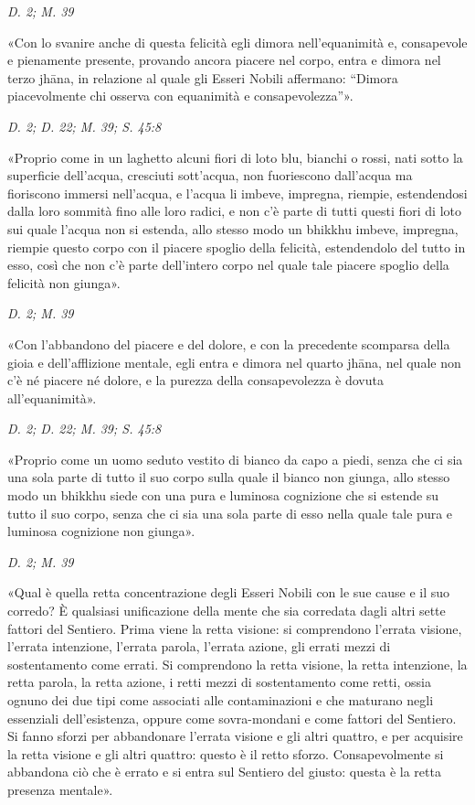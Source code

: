 \emph{D. 2; M. 39}


«Con lo svanire anche di questa felicità egli dimora nell’equanimità e,
consapevole e pienamente presente, provando ancora piacere nel corpo,
entra e dimora nel terzo jhāna, in relazione al quale gli Esseri Nobili
affermano: “Dimora piacevolmente chi osserva con equanimità e
consapevolezza”».


\emph{D. 2; D. 22; M. 39; S. 45:8}


«Proprio come in un laghetto alcuni fiori di loto blu, bianchi o rossi,
nati sotto la superficie dell’acqua, cresciuti sott’acqua, non
fuoriescono dall’acqua ma fioriscono immersi nell’acqua, e l’acqua li
imbeve, impregna, riempie, estendendosi dalla loro sommità fino alle
loro radici, e non c’è parte di tutti questi fiori di loto sui quale
l’acqua non si estenda, allo stesso modo un bhikkhu imbeve, impregna,
riempie questo corpo con il piacere spoglio della felicità, estendendolo
del tutto in esso, così che non c’è parte dell’intero corpo nel quale
tale piacere spoglio della felicità non giunga».


\emph{D. 2; M. 39}


«Con l’abbandono del piacere e del dolore, e con la precedente scomparsa
della gioia e dell’afflizione mentale, egli entra e dimora nel quarto
jhāna, nel quale non c’è né piacere né dolore, e la purezza della
consapevolezza è dovuta all’equanimità».


\emph{D. 2; D. 22; M. 39; S. 45:8}


«Proprio come un uomo seduto vestito di bianco da capo a piedi, senza
che ci sia una sola parte di tutto il suo corpo sulla quale il bianco
non giunga, allo stesso modo un bhikkhu siede con una pura e luminosa
cognizione che si estende su tutto il suo corpo, senza che ci sia una
sola parte di esso nella quale tale pura e luminosa cognizione non
giunga».


\emph{D. 2; M. 39}


«Qual è quella retta concentrazione degli Esseri Nobili con le sue cause
e il suo corredo? È qualsiasi unificazione della mente che sia corredata
dagli altri sette fattori del Sentiero. Prima viene la retta visione: si
comprendono l’errata visione, l’errata intenzione, l’errata parola,
l’errata azione, gli errati mezzi di sostentamento come errati. Si
comprendono la retta visione, la retta intenzione, la retta parola, la
retta azione, i retti mezzi di sostentamento come retti, ossia ognuno
dei due tipi come associati alle contaminazioni e che maturano negli
essenziali dell’esistenza, oppure come sovra-mondani e come fattori del
Sentiero. Si fanno sforzi per abbandonare l’errata visione e gli altri
quattro, e per acquisire la retta visione e gli altri quattro: questo è
il retto sforzo. Consapevolmente si abbandona ciò che è errato e si
entra sul Sentiero del giusto: questa è la retta presenza mentale».


